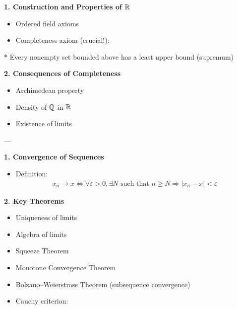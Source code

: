 \documentclass[12pt,a4paper]{report}
\begin{document}
\begin{description}
\item {}

	\begin{description}
    \item \textbf{1. Construction and Properties of $\mathbb{R}$}

		\begin{itemize}
        \item Ordered field axioms
        \item Completeness axiom (crucial!):
		\end{itemize}

  * Every nonempty set bounded above has a least upper bound (supremum)

    \item \textbf{2. Consequences of Completeness}

		\begin{itemize}
        \item Archimedean property
        \item Density of $\mathbb{Q}$ in $\mathbb{R}$
        \item Existence of limits
		\end{itemize}

	\end{description}
---

\item {}

	\begin{description}
    \item \textbf{1. Convergence of Sequences}

		\begin{itemize}
        \item Definition:
  \begin{align*}
  x_n \to x \iff \forall \varepsilon > 0, \exists N \text{ such that } n \ge N \Rightarrow |x_n - x| < \varepsilon
  \end{align*}
		\end{itemize}

    \item \textbf{2. Key Theorems}

		\begin{itemize}
        \item Uniqueness of limits
        \item Algebra of limits
        \item Squeeze Theorem
        \item Monotone Convergence Theorem
        \item Bolzano–Weierstrass Theorem (subsequence convergence)
        \item Cauchy criterion:
		\end{itemize}


\end{description}
\end{description}
\end{document}
